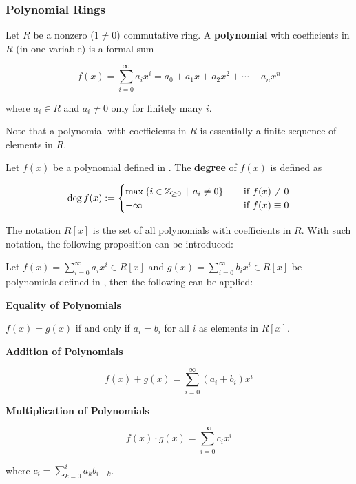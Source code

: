 \documentclass[a4paper,12pt]{article}
\begin{document}
\subsubsection{Polynomial Rings}
\begin{dft}
  Let $R$ be a nonzero ($1\neq 0$) commutative ring. A \textbf{polynomial} with coefficients in $R$ (in one variable) is a formal sum

  $$f(x)=\sum_{i=0}^{\infty}a_{i}x^{i}=a_{0}+a_{1}x+a_{2}x^{2}+\cdots+a_{n}x^{n}$$\s

  where $a_{i}\in R$ and $a_{i}\neq 0$ only for finitely many $i$.
\end{dft}\n

Note that a polynomial with coefficients in $R$ is essentially a finite sequence of elements in $R$.\n

\begin{dft}
  Let $f(x)$ be a polynomial defined in \rdft[\sctr{1}]. The \textbf{degree} of $f(x)$ is defined as

  $$\deg f(x):=\begin{cases}
    \max\left\{ i\in\mathbb{Z}_{\geq 0}\,\mid\, a_{i}\neq 0\right\}&\;\;\;\;\text{if }f(x)\not\equiv 0\\
    -\infty&\;\;\;\;\text{if }f(x)\equiv 0
  \end{cases}$$
\end{dft}\n

The notation $R[x]$ is the set of all polynomials with coefficients in $R$. With such notation, the following proposition can be introduced:\n

\begin{pst}
  Let $f(x)=\sum_{i=0}^{\infty}a_{i}x^{i}\in R[x]$ and $g(x)=\sum_{i=0}^{\infty}b_{i}x^{i}\in R[x]$ be polynomials defined in \rdft[\sctr{2}], then the following can be applied:

  \begin{alist}
    \item \textbf{Equality of Polynomials}\n

    $f(x)=g(x)$ if and only if $a_{i}=b_{i}$ for all $i$ as elements in $R[x]$.
    \item \textbf{Addition of Polynomials}\n

    $$f(x)+g(x)=\sum_{i=0}^{\infty}(a_{i}+b_{i})x^{i}$$

    \item \textbf{Multiplication of Polynomials}\n

    $$f(x)\cdot g(x)=\sum_{i=0}^{\infty}c_{i}x^{i}$$\s

    where $c_{i}=\sum_{k=0}^{i}a_{k}b_{i-k}$.
  \end{alist}
\end{pst}\n
\end{document}
